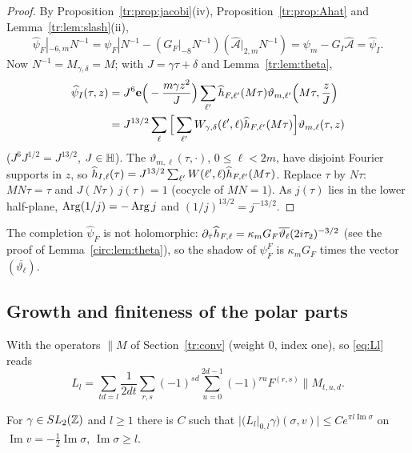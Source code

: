 \begin{proof}
By Proposition~\ref{tr:prop:jacobi}(iv), Proposition~\ref{tr:prop:Ahat} and Lemma~\ref{tr:lem:slash}(ii),
\[
\widehat\psi_F|_{-6,m}N^{-1}=\psi_F|N^{-1}-(G_F|_{-8}N^{-1})(\widehat{\mathcal A}|_{2,m}N^{-1})=\psi_m-G_I\widehat{\mathcal A}=\widehat\psi_I.
\] Now $N^{-1}=M_{\gamma,\delta}=M$; with $J=\gamma\tau+\delta$ and Lemma~\ref{tr:lem:theta},
\[
\begin{aligned}
\widehat\psi_I(\tau,z)&=J^6\mathbf e\Big(-\frac{m\gamma z^2}J\Big)\sum_{\ell'}\widehat h_{F,\ell'}(M\tau)\vartheta_{m,\ell'}\Big(M\tau,\frac zJ\Big)\\&=J^{13/2}\sum_\ell\Big[\sum_{\ell'}W_{\gamma,\delta}(\ell',\ell)\widehat h_{F,\ell'}(M\tau)\Big]\vartheta_{m,\ell}(\tau,z)
\end{aligned}
\]
($J^6J^{1/2}=J^{13/2}$, $J\in\mathbb{H}$). The $\vartheta_{m,\ell}(\tau,\cdot)$, $0\le\ell<2m$, have disjoint Fourier supports in $z$, so $\widehat h_{I,\ell}(\tau)=J^{13/2}\sum_{\ell'}W(\ell',\ell)\widehat h_{F,\ell'}(M\tau)$. Replace $\tau$ by $N\tau$: $M N\tau=\tau$ and $J(N\tau)\,j(\tau)=1$ (cocycle of $MN=1$). As $j(\tau)$ lies in the lower half-plane, $\operatorname{Arg}(1/j)=-\operatorname{Arg} j$ and $(1/j)^{13/2}=j^{-13/2}$.
\end{proof}

\begin{remark}
The completion $\widehat\psi_F$ is not holomorphic: $\partial_{\bar\tau}\widehat h_{F,\ell}=\kappa_mG_F\overline{\vartheta_\ell}(2i\tau_2)^{-3/2}$ (see the proof of Lemma~\ref{circ:lem:theta}), so the shadow of $\psi^F_F$ is $\kappa_mG_F$ times the vector $(\overline{\vartheta_\ell})$.
\end{remark}

\subsection{Growth and finiteness of the polar parts}\label{tr:growth}
With the operators $\|M$ of Section~\ref{tr:conv} (weight $0$, index one), so \eqref{eq:Ll} reads
\begin{equation}\label{tr:Ll}
L_l=\sum_{td=l}\frac1{2dt}\sum_{r,s}(-1)^{sd}\sum_{u=0}^{2d-1}(-1)^{ru}F^{(r,s)}\|M_{t,u,d}.
\end{equation}

\begin{lemma}\label{tr:lem:Lbound}
For $\gamma\in SL_2(\mathbb{Z})$ and $l\ge1$ there is $C$ such that $|(L_l|_{0,l}\gamma)(\sigma,v)|\le Ce^{\pi l\operatorname{Im}\sigma}$ on $\operatorname{Im}v=-\frac12\operatorname{Im}\sigma$, $\operatorname{Im}\sigma\ge l$.
\end{lemma}

